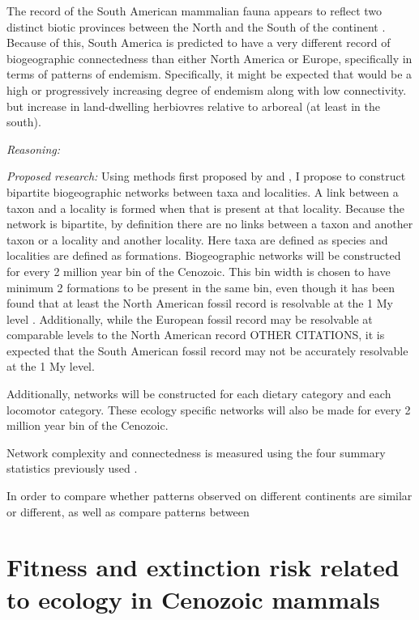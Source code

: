 \documentclass[12pt,letterpaper]{article}
\begin{document}
The record of the South American mammalian fauna appears to reflect two distinct biotic provinces between the North and the South of the continent \citep{Macfadden1997,Macfadden2006,Flynn1998a,Patterson1968}. Because of this, South America is predicted to have a very different record of biogeographic connectedness than either North America or Europe, specifically in terms of patterns of endemism. Specifically, it might be expected that would be a high or progressively increasing degree of endemism along with low connectivity. but increase in land-dwelling herbiovres relative to arboreal (at least in the south).

\textit{Reasoning:}

\textit{Proposed research:}
Using methods first proposed by \citet{Sidor2013} and \citet{Vilhena2013}, I propose to construct bipartite biogeographic networks between taxa and localities. A link between a taxon and a locality is formed when that is present at that locality. Because the network is bipartite, by definition there are no links between a taxon and another taxon or a locality and another locality. Here taxa are defined as species and localities are defined as formations. Biogeographic networks will be constructed for every 2 million year bin of the Cenozoic. This bin width is chosen to have minimum 2 formations to be present in the same bin, even though it has been found that at least the North American fossil record is resolvable at the 1 My level \citep{Alroy2000a,Alroy1996a,Alroy1998}. Additionally, while the European fossil record may be resolvable at comparable levels to the North American record \citep{Jernvall2002,Jernvall2004} OTHER CITATIONS, it is expected that the South American fossil record may not be accurately resolvable at the 1 My level.

Additionally, networks will be constructed for each dietary category and each locomotor category. These ecology specific networks will also be made for every 2 million year bin of the Cenozoic.

Network complexity and connectedness is measured using the four summary statistics previously used \citep{Sidor2013}.

In order to compare whether patterns observed on different continents are similar or different, as well as compare patterns between 


\section{Fitness and extinction risk related to ecology in Cenozoic mammals}
\end{document}
